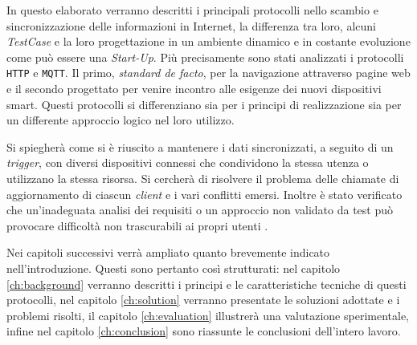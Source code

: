 In questo elaborato verranno descritti i principali protocolli nello scambio e sincronizzazione delle informazioni in Internet, la differenza tra loro, alcuni \textit{TestCase} e la loro progettazione in un ambiente dinamico e in costante evoluzione come può essere una \textit{Start-Up}.
Più precisamente sono stati analizzati i protocolli \verb+HTTP+ e \verb+MQTT+.
Il primo, \textit{standard de facto}, per la navigazione attraverso pagine web e il secondo progettato per venire incontro alle esigenze dei nuovi dispositivi smart.
Questi protocolli si differenziano sia per i principi di realizzazione sia per un differente approccio logico nel loro utilizzo.

Si spiegherà come si è riuscito a mantenere i dati sincronizzati, a seguito di un \textit{trigger}, con diversi dispositivi connessi che condividono la stessa utenza o utilizzano la stessa risorsa.
Si cercherà di risolvere il problema delle chiamate di aggiornamento di ciascun \textit{client} e i vari conflitti emersi.
Inoltre è stato verificato che un'inadeguata analisi dei requisiti o un approccio non validato da test può provocare difficoltà non trascurabili ai propri utenti \cite{CPUSpin}.

Nei capitoli successivi verrà ampliato quanto brevemente indicato nell'introduzione.
Questi sono pertanto così strutturati: nel capitolo \ref{ch:background} verranno descritti i principi e le caratteristiche tecniche di questi protocolli, nel capitolo \ref{ch:solution} verranno presentate le soluzioni adottate e i problemi risolti, il capitolo \ref{ch:evaluation} illustrerà una valutazione sperimentale, infine nel capitolo \ref{ch:conclusion} sono riassunte le conclusioni dell’intero lavoro.
